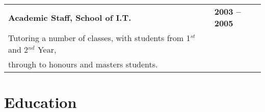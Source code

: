 \documentclass[]{article}
\begin{document}
\begin{table*}[h!]
\begin{tabular}[h!]{p{12.7cm}l}

\textbf{Academic Staff, School of I.T.} & \textbf{2003 -- 2005} \\
\hspace{0.5cm}Tutoring a number of classes, with students from 1$^{st}$ and 2$^{nd}$ Year, & \\
\hspace{0.5cm}through to honours and masters students. & \\

\end{tabular}
\end{table*}

\section*{Education}
\end{document}
